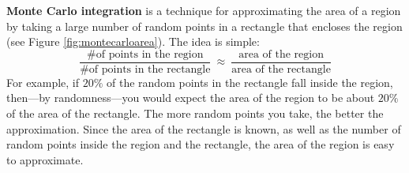 \piccaption[]{\label{fig:montecarloarea}}
\textbf{Monte Carlo integration} is a technique
for approximating the area of a region by taking a large number of random
points in a rectangle that encloses the region (see Figure
\ref{fig:montecarloarea}). The idea is simple:
\[
\frac{\text{\# of points in the region}}{\text{\# of points in the rectangle}}
~\approx~ \frac{\text{area of the region}}{\text{area of the rectangle}}
\]
For example, if $20\%$ of the random points in the rectangle fall inside the
region, then---by randomness---you would expect the area of the region to be
about $20\%$ of the area of the rectangle. The more random points you take, the
better the approximation. Since the area of the rectangle is known, as
well as the number of random points inside the region and the rectangle, the
area of the region is easy to approximate.
\newpage
